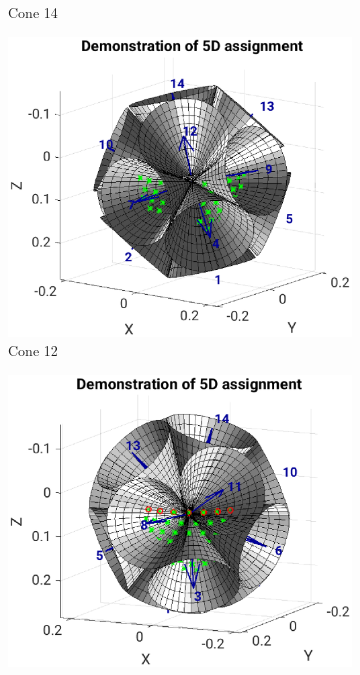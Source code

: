 \begin{figure}[H]
\begin{subfigure}[b]{0.49\textwidth}
         \caption{Cone 14}
         \label{fig:res:5th_4th_cones14}
     \end{subfigure}
     \hfill
     \begin{subfigure}[b]{0.49\textwidth}
         \centering
         \includegraphics[width=1.3\textwidth,right]{Graphics/Results/4d_5d/5thDim_over_4thDim_150_150_150_cones_7_9_center.eps}
         \caption{Cone 12}
         \label{fig:res:5th_4th_cones12}
     \end{subfigure}
     \hfill
     \begin{subfigure}[b]{0.49\textwidth}
         \centering
         \includegraphics[width=1.3\textwidth,right]{Graphics/Results/4d_5d/5thDim_over_4thDim_150_150_150_cones_8_11_center.eps}

\end{subfigure}
\end{figure}
